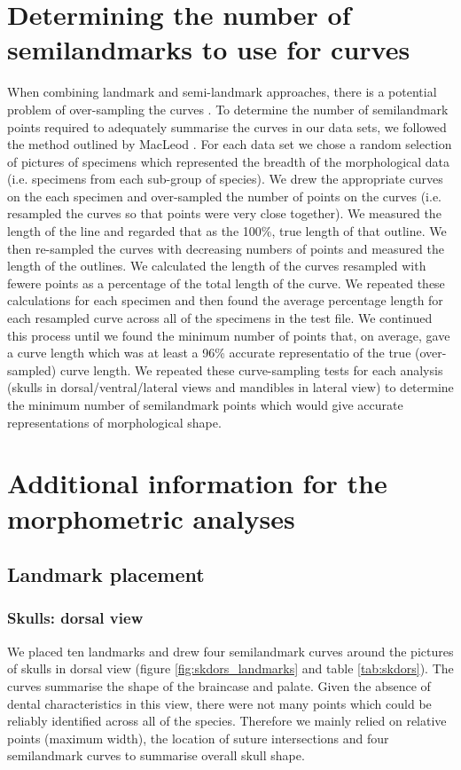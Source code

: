 \documentclass[12pt,a4paper]{article}
\begin{document}
\section{Determining the number of semilandmarks to use for curves}
	When combining landmark and semi-landmark approaches, there is a potential problem of over-sampling the curves \citep{Gunz2013}. To determine the number of semilandmark points required to adequately summarise the curves in our data sets,  we followed the method outlined by MacLeod \citeyearpar{MacLeod2012}. 
	For each data set we chose a random selection of pictures of specimens which represented the breadth of the morphological data (i.e. specimens from each sub-group of species).  We drew the appropriate curves on the each specimen and over-sampled the number of points on the curves (i.e. resampled the curves so that points were very close together). 
	We measured the length of the line and regarded that as the 100\%, true length of that outline. We then re-sampled the curves with decreasing numbers of points and measured the length of the outlines. We calculated the length of the curves resampled with fewere points as a percentage of the total length of the curve. We repeated these calculations for each specimen and then found the average percentage length for each resampled curve across all of the specimens in the test file. We continued this process until we found the minimum number of points that, on average, gave a curve length which was at least a 96\% accurate representatio of the true (over-sampled) curve length.  
	We repeated these curve-sampling tests for each analysis (skulls in dorsal/ventral/lateral views and mandibles in lateral view) to determine the minimum number of semilandmark points which would give accurate representations of morphological shape.

\section{Additional information for the morphometric analyses}

\subsection{Landmark placement}

\subsubsection{Skulls: dorsal view}
	We placed ten landmarks and drew four semilandmark curves around the pictures of skulls in dorsal view (figure \ref{fig:skdors_landmarks} and table \ref{tab:skdors}). The curves summarise the shape of the braincase and palate.
	Given the absence of dental characteristics in this view, there were not many points which could be reliably identified across all of the species. Therefore we mainly relied on relative points (maximum width), the location of suture intersections and four semilandmark curves to summarise overall skull shape.  
\end{document}
